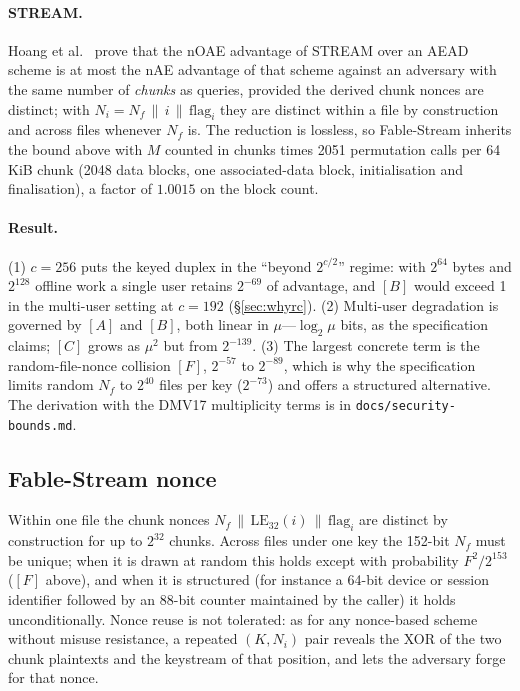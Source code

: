 \documentclass{iacrtrans}
\newcommand{\FableStream}{\textsf{Fable-Stream}\xspace}
\begin{document}
\paragraph{STREAM.} Hoang et al.~\cite{HRRV15} prove that the nOAE advantage of STREAM over an AEAD scheme is at most the nAE advantage of that scheme against an adversary with the same number of \emph{chunks} as queries, provided the derived chunk nonces are distinct; with $N_i = N_f\,\|\,i\,\|\,\mathrm{flag}_i$ they are distinct within a file by construction and across files whenever $N_f$ is. The reduction is lossless, so \FableStream inherits the bound above with $M$ counted in chunks times 2051 permutation calls per 64\,KiB chunk (2048 data blocks, one associated-data block, initialisation and finalisation), a factor of $1.0015$ on the block count.

\paragraph{Result.} (1) $c = 256$ puts the keyed duplex in the ``beyond $2^{c/2}$'' regime: with $2^{64}$ bytes and $2^{128}$ offline work a single user retains $2^{-69}$ of advantage, and $[B]$ would exceed 1 in the multi-user setting at $c = 192$ (\S\ref{sec:whyrc}). (2) Multi-user degradation is governed by $[A]$ and $[B]$, both linear in $\mu$---$\log_2\mu$ bits, as the specification claims; $[C]$ grows as $\mu^2$ but from $2^{-139}$. (3) The largest concrete term is the random-file-nonce collision $[F]$, $2^{-57}$ to $2^{-89}$, which is why the specification limits random $N_f$ to $2^{40}$ files per key ($2^{-73}$) and offers a structured alternative. The derivation with the DMV17 multiplicity terms is in \texttt{docs/security-bounds.md}.

\subsection{Fable-Stream nonce}
\label{sec:stream}
Within one file the chunk nonces $N_f\,\|\,\mathrm{LE}_{32}(i)\,\|\,\mathrm{flag}_i$ are distinct by construction for up to $2^{32}$ chunks. Across files under one key the 152-bit $N_f$ must be unique; when it is drawn at random this holds except with probability $F^2/2^{153}$ ($[F]$ above), and when it is structured (for instance a 64-bit device or session identifier followed by an 88-bit counter maintained by the caller) it holds unconditionally. Nonce reuse is not tolerated: as for any nonce-based scheme without misuse resistance, a repeated $(K, N_i)$ pair reveals the XOR of the two chunk plaintexts and the keystream of that position, and lets the adversary forge for that nonce.
\end{document}
